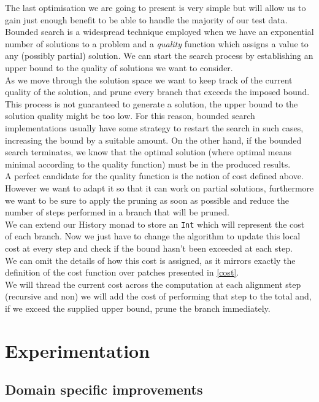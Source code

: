 \documentclass[11pt, titlepage]{article}
\begin{document}
The last optimisation we are going to present is very simple but will allow us to gain just enough benefit to be able to handle the majority of our test data. 
Bounded search is a widespread technique employed when we have an exponential number of solutions to a problem and a \emph{quality} function which assigns a value to any (possibly partial) solution. We can start the search process by establishing an upper bound to the quality of solutions we want to consider. 
\\
As we move through the solution space we want to keep track of the current quality of the solution, and prune every branch that exceeds the imposed bound. 
This process is not guaranteed to generate a solution, the upper bound to the solution quality might be too low. For this reason, bounded search implementations usually have some strategy to restart the search in such cases, increasing the bound by a suitable amount. On the other hand, if the bounded search terminates, we know that the optimal solution (where optimal means minimal according to the quality function) must be in the produced results.
\\
A perfect candidate for the quality function is the notion of cost defined above. However we want to adapt it so that it can work on partial solutions, furthermore we want to be sure to apply the pruning as soon as possible and reduce the number of steps performed in a branch that will be pruned.
\\
We can extend our History monad to store an \texttt{Int} which will represent the cost of each branch. Now we just have to change the algorithm to update this local cost at every step and check if the bound hasn't been exceeded at each step. 
\\
We can omit the details of how this cost is assigned, as it mirrors exactly the definition of the cost function over patches presented in \ref{cost}. 
\\
We will thread the current cost across the computation at each alignment step (recursive and non) we will add the cost of performing that step to the total and, if we exceed the supplied upper bound, prune the branch immediately.

\section{Experimentation}

\subsection{Domain specific improvements}
\end{document}
